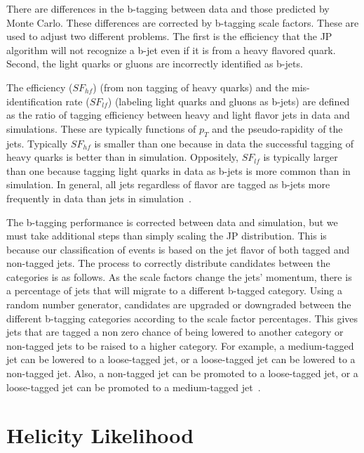 There are differences in the b-tagging between data and those predicted by Monte Carlo.  These differences are corrected by b-tagging scale factors.  These are used to adjust two different problems.  The first is the efficiency that the JP algorithm will not recognize a b-jet even if it is from a heavy flavored quark.  Second, the light quarks or gluons are incorrectly identified as b-jets.  

The efficiency ($SF_{hf}$) (from non tagging of heavy quarks) and the mis-identification rate ($SF_{lf}$) (labeling light quarks and gluons as b-jets) are defined as the ratio of tagging efficiency between heavy and light flavor jets in data and simulations.  These are typically functions of $p_T$ and the pseudo-rapidity of the jets.  Typically $SF_{hf}$ is smaller than one because in data the successful tagging of heavy quarks is better than in simulation.  Oppositely, $SF_{lf}$ is typically larger than one because tagging light quarks in data as b-jets is more common than in simulation.  In general, all jets regardless of flavor are tagged as b-jets more frequently in data than jets in simulation~\cite{CMS-PAS-BTV-11-004}.

The b-tagging performance is corrected between data and simulation, but we must take additional steps than simply scaling the JP distribution.  This is because our classification of events is based on the jet flavor of both tagged and non-tagged jets.  The process to correctly distribute candidates between the categories is as follows.  As the scale factors change the jets' momentum, there is a percentage of jets that will migrate to a different b-tagged category. Using a random number generator, candidates are upgraded or downgraded between the different b-tagging categories according to the scale factor percentages. This gives jets that are tagged a non zero chance of being lowered to another category or non-tagged jets to be raised to a higher category.  For example, a medium-tagged jet can be lowered to a loose-tagged jet, or a loose-tagged jet can be lowered to a non-tagged jet.  Also, a non-tagged jet can be promoted to a loose-tagged jet, or a loose-tagged jet can be promoted to a medium-tagged jet~\cite{2l2q115}.


\section{Helicity Likelihood}

